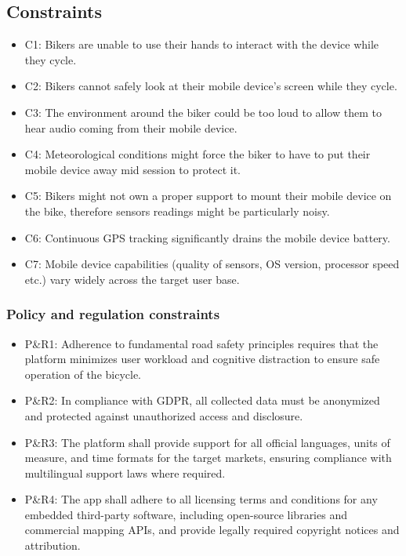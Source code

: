 \documentclass{article}
\begin{document}
\subsection{Constraints} %
\begin{itemize}
    \item C1: Bikers are unable to use their hands to interact with the device while they cycle.
    \item C2: Bikers cannot safely look at their mobile device's screen while they cycle.
    \item C3: The environment around the biker could be too loud to allow them to hear audio coming from their mobile device.
    \item C4: Meteorological conditions might force the biker to have to put their mobile device away mid session to protect it.
    \item C5: Bikers might not own a proper support to mount their mobile device on the bike, therefore sensors readings might be particularly noisy.
    \item C6: Continuous GPS tracking significantly drains the mobile device battery.
    \item C7: Mobile device capabilities (quality of sensors, OS version, processor speed etc.) vary widely across the target user base.
\end{itemize}

\subsubsection{Policy and regulation constraints}
\begin{itemize}
    \item P\&R1: Adherence to fundamental road safety principles requires that the platform minimizes user workload and cognitive distraction to ensure safe operation of the bicycle.
    \item P\&R2: In compliance with GDPR, all collected data must be anonymized and protected against unauthorized access and disclosure.
    \item P\&R3: The platform shall provide support for all official languages, units of measure, and time formats for the target markets, ensuring compliance with multilingual support laws where required.
    \item P\&R4: The app shall adhere to all licensing terms and conditions for any embedded third-party software, including open-source libraries and commercial mapping APIs, and provide legally required copyright notices and attribution.
\end{itemize}
\end{document}
